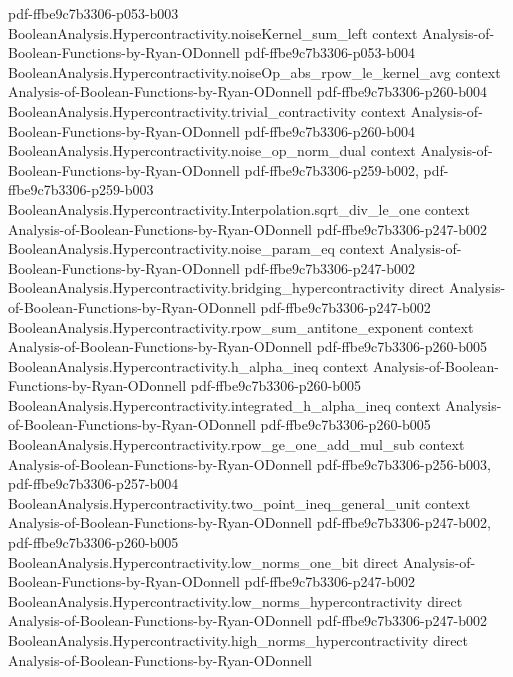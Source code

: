\begin{theorem}
  {pdf-ffbe9c7b3306-p053-b003}
\proofstep
  {BooleanAnalysis.Hypercontractivity.noiseKernel_sum_left}
  {context}
  {Analysis-of-Boolean-Functions-by-Ryan-ODonnell}
  {pdf-ffbe9c7b3306-p053-b004}
\proofstep
  {BooleanAnalysis.Hypercontractivity.noiseOp_abs_rpow_le_kernel_avg}
  {context}
  {Analysis-of-Boolean-Functions-by-Ryan-ODonnell}
  {pdf-ffbe9c7b3306-p260-b004}
\proofstep
  {BooleanAnalysis.Hypercontractivity.trivial_contractivity}
  {context}
  {Analysis-of-Boolean-Functions-by-Ryan-ODonnell}
  {pdf-ffbe9c7b3306-p260-b004}
\proofstep
  {BooleanAnalysis.Hypercontractivity.noise_op_norm_dual}
  {context}
  {Analysis-of-Boolean-Functions-by-Ryan-ODonnell}
  {pdf-ffbe9c7b3306-p259-b002,
    pdf-ffbe9c7b3306-p259-b003}
\proofstep
  {BooleanAnalysis.Hypercontractivity.Interpolation.sqrt_div_le_one}
  {context}
  {Analysis-of-Boolean-Functions-by-Ryan-ODonnell}
  {pdf-ffbe9c7b3306-p247-b002}
\proofstep
  {BooleanAnalysis.Hypercontractivity.noise_param_eq}
  {context}
  {Analysis-of-Boolean-Functions-by-Ryan-ODonnell}
  {pdf-ffbe9c7b3306-p247-b002}
\proofstep
  {BooleanAnalysis.Hypercontractivity.bridging_hypercontractivity}
  {direct}
  {Analysis-of-Boolean-Functions-by-Ryan-ODonnell}
  {pdf-ffbe9c7b3306-p247-b002}
\proofstep
  {BooleanAnalysis.Hypercontractivity.rpow_sum_antitone_exponent}
  {context}
  {Analysis-of-Boolean-Functions-by-Ryan-ODonnell}
  {pdf-ffbe9c7b3306-p260-b005}
\proofstep
  {BooleanAnalysis.Hypercontractivity.h_alpha_ineq}
  {context}
  {Analysis-of-Boolean-Functions-by-Ryan-ODonnell}
  {pdf-ffbe9c7b3306-p260-b005}
\proofstep
  {BooleanAnalysis.Hypercontractivity.integrated_h_alpha_ineq}
  {context}
  {Analysis-of-Boolean-Functions-by-Ryan-ODonnell}
  {pdf-ffbe9c7b3306-p260-b005}
\proofstep
  {BooleanAnalysis.Hypercontractivity.rpow_ge_one_add_mul_sub}
  {context}
  {Analysis-of-Boolean-Functions-by-Ryan-ODonnell}
  {pdf-ffbe9c7b3306-p256-b003,
    pdf-ffbe9c7b3306-p257-b004}
\proofstep
  {BooleanAnalysis.Hypercontractivity.two_point_ineq_general_unit}
  {context}
  {Analysis-of-Boolean-Functions-by-Ryan-ODonnell}
  {pdf-ffbe9c7b3306-p247-b002,
    pdf-ffbe9c7b3306-p260-b005}
\proofstep
  {BooleanAnalysis.Hypercontractivity.low_norms_one_bit}
  {direct}
  {Analysis-of-Boolean-Functions-by-Ryan-ODonnell}
  {pdf-ffbe9c7b3306-p247-b002}
\proofstep
  {BooleanAnalysis.Hypercontractivity.low_norms_hypercontractivity}
  {direct}
  {Analysis-of-Boolean-Functions-by-Ryan-ODonnell}
  {pdf-ffbe9c7b3306-p247-b002}
\proofstep
  {BooleanAnalysis.Hypercontractivity.high_norms_hypercontractivity}
  {direct}
  {Analysis-of-Boolean-Functions-by-Ryan-ODonnell}

\end{theorem}
